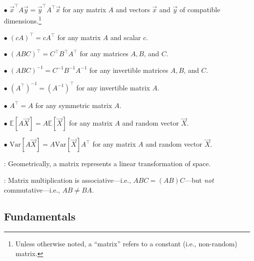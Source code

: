 \documentclass[12pt,oneside]{article}
\newcommand{\E}{\mathbb{E}}
\newcommand{\Var}{\text{Var}}
\newcommand{\tip}{\textbf{\faLightbulb}: }
\newcommand{\warning}{\textbf{\Biohazard}: }
\theoremstyle{definition}
\theoremstyle{remark}
\begin{document}
$\bullet$ $\vec{x}^\top A \vec{y} = \vec{y}^\top A^{\top} \vec{x}$ for any matrix $A$ and vectors $\vec{x}$ and $\vec{y}$ of compatible dimensions.\footnote{Unless otherwise noted, a \enquote{matrix} refers to a constant (i.e., non-random) matrix.}

$\bullet$ $(cA)^{\top} = cA^{\top}$ for any matrix $A$ and scalar $c$.

$\bullet$ $(ABC)^{\top} = C^{\top}B^{\top}A^{\top}$ for any matrices $A, B$, and $C$.

$\bullet$ $(ABC)^{-1} = C^{-1}B^{-1}A^{-1}$ for any invertible matrices $A, B$, and $C$.

$\bullet$ $(A^{\top})^{-1} = (A^{-1})^{\top}$ for any invertible matrix $A$.

$\bullet$ $A^{\top} = A$ for any symmetric matrix $A$.

$\bullet$ $\E[A \vec{X}] = A \E[\vec{X}]$ for any matrix $A$ and random vector $\vec{X}$.

$\bullet$ $\Var[A \vec{X}] = A \Var[\vec{X}] A^{\top}$ for any matrix $A$ and random vector $\vec{X}$.

\tip Geometrically, a matrix represents a linear transformation of space.

\warning Matrix multiplication is associative—i.e., $ABC = (AB)C$—but \textit{not} commutative—i.e., $AB \neq BA$.

\subsection{Fundamentals}
\end{document}
